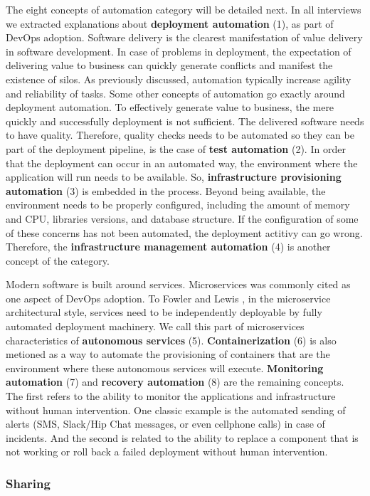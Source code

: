 The eight concepts of automation category will be detailed next.
In all interviews we extracted explanations about \textbf{deployment
automation} (1), as part of DevOps adoption. Software delivery is the clearest
manifestation of value delivery in software development. In case of problems
in deployment, the expectation of delivering value to business can quickly
generate conflicts and manifest the existence of silos. As previously discussed,
automation typically increase agility and reliability of tasks. Some other
concepts of automation go exactly around deployment automation. To
effectively generate value to business, the mere quickly and successfully
deployment is not sufficient. The delivered software needs to have quality.
Therefore, quality checks needs to be automated so they can be part of the
deployment pipeline, is the case of \textbf{test automation} (2). In order
that the deployment can occur in an automated way, the environment where the
application will run needs to be available. So, \textbf{infrastructure
provisioning automation} (3) is embedded in the process. Beyond being available,
the environment needs to be properly configured, including the amount of memory and CPU,
libraries versions, and database structure. If the configuration of some of these concerns
has not been automated, the deployment actitivy can go wrong. Therefore,
the \textbf{infrastructure management automation} (4) is another
concept of the  category.

Modern software is built around services. Microservices  was commonly cited
as one aspect of DevOps adoption. To Fowler and Lewis
\cite{martinfowler2014microservices}, in the
microservice architectural style, services need to be independently deployable
by fully automated deployment machinery. We call this part of microservices
characteristics of \textbf{autonomous services} (5). \textbf{Containerization}
(6) is also metioned as a way to automate the provisioning of containers that are the
environment where these autonomous services will execute.
\textbf{Monitoring automation} (7) and \textbf{recovery automation} (8) are the
remaining concepts. The first refers to the ability to monitor the
applications and infrastructure without human intervention. One classic example
is the automated sending of alerts (SMS, Slack/Hip Chat messages, or even
cellphone calls) in case of incidents. And the second is related to the ability
to replace a component that is not working or
roll back a failed deployment without human intervention.

\subsubsection*{Sharing}

